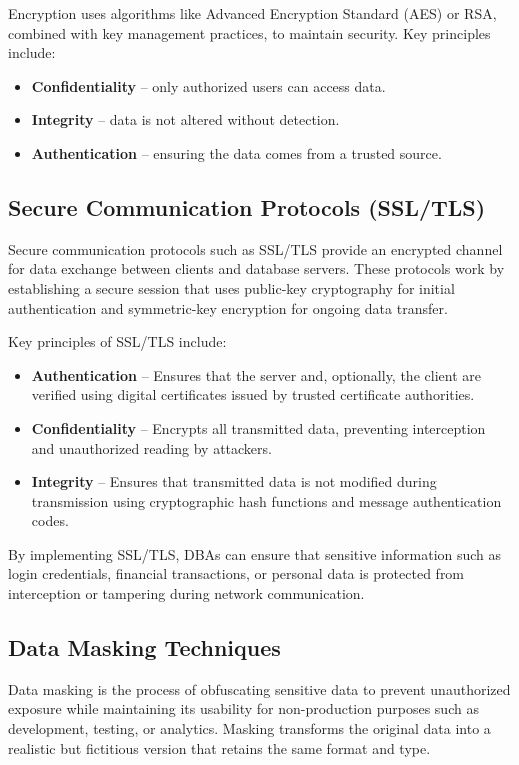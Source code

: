 \documentclass[12pt,a4paper]{article}
\begin{document}
Encryption uses algorithms like Advanced Encryption Standard (AES) or RSA, combined with key management practices, to maintain security. Key principles include:

\begin{itemize}
  \item \textbf{Confidentiality} -- only authorized users can access data.
  \item \textbf{Integrity} -- data is not altered without detection.
  \item \textbf{Authentication} -- ensuring the data comes from a trusted source.
\end{itemize}

\subsection{Secure Communication Protocols (SSL/TLS)}

Secure communication protocols such as SSL/TLS provide an encrypted channel for data exchange between clients and database servers. These protocols work by establishing a secure session that uses public-key cryptography for initial authentication and symmetric-key encryption for ongoing data transfer.

Key principles of SSL/TLS include:

\begin{itemize}
  \item \textbf{Authentication} -- Ensures that the server and, optionally, the client are verified using digital certificates issued by trusted certificate authorities.
  \item \textbf{Confidentiality} -- Encrypts all transmitted data, preventing interception and unauthorized reading by attackers.
  \item \textbf{Integrity} -- Ensures that transmitted data is not modified during transmission using cryptographic hash functions and message authentication codes.
\end{itemize}

By implementing SSL/TLS, DBAs can ensure that sensitive information such as login credentials, financial transactions, or personal data is protected from interception or tampering during network communication.

\subsection{Data Masking Techniques}

Data masking is the process of obfuscating sensitive data to prevent unauthorized exposure while maintaining its usability for non-production purposes such as development, testing, or analytics. Masking transforms the original data into a realistic but fictitious version that retains the same format and type.
\end{document}

